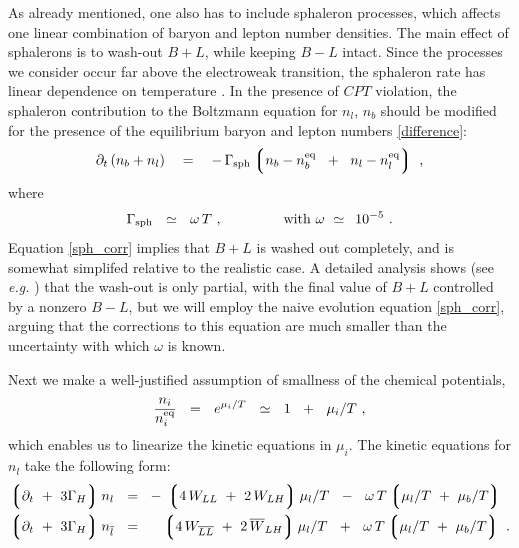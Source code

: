 \documentclass[12pt]{revtex4}
\newcommand{\eq}{{\rm eq}}
\newcommand{\lgr}{\left\lgroup}
\newcommand{\rgr}{\right\rgroup}
\newcommand{\Gsph}{\Gamma_{\rm sph}}
\newcommand{\p}{\partial}
\newcommand{\ov}{\overline}
\begin{document}
	As already mentioned,
	one also has to include sphaleron processes, which affects 
	one linear combination of baryon and lepton number densities.
	The main effect of sphalerons is to wash-out $ B + L $,
	while keeping $ B - L $ intact. 
	Since the processes we consider occur far above the electroweak transition,  the sphaleron rate
has linear
	dependence on temperature 
\cite{Kuzmin:1985mm,Khlebnikov:1988sr}. 
	In the presence of $CPT$ violation, the sphaleron contribution to the Boltzmann equation
	for $ n_l $, $ n_b $ 
\cite{Kuzmin:1985mm,Moore:2000mx,Moore:2000ar} should be modified for the presence of the 
equilibrium baryon and lepton numbers \eqref{difference}:
\begin{equation}
\label{sph_corr}
	\p_t\, (n_b + n_l)
	~~~=~~~ -\, \Gsph 
		\lgr   n_b - n_b^\eq \;~+~\;
		       n_l - n_l^\eq 
		\rgr~,
\end{equation}
	where
\[
	\Gsph ~~\simeq~~ \omega\, T~, \qquad\qquad 
	{\rm ~with~}
	\omega ~\simeq~ \,10^{-5}~.
\]
	Equation \eqref{sph_corr} implies that $ B + L $ is washed out completely,
	and is somewhat simplifed relative to the realistic case.
	A detailed analysis shows (see {\em e.g.}
\cite{Harvey:1990qw})
	that the wash-out is only partial, with the final value of $B+L$ controlled by a nonzero $B-L$,
but we will employ the naive evolution equation
	\eqref{sph_corr}, arguing that the corrections to this equation are much smaller
	than the uncertainty with which $ \omega $ is known.
	
	Next we make a well-justified assumption of 
	smallness of the chemical potentials,
\[
	\frac{n_i}{n_i^\eq} ~~=~~ e^{\mu_i/T} ~~\simeq~~ 1 ~~+~~ \mu_i/T~,
\]
	which enables us to linearize the kinetic equations in $ \mu_i $.	
The kinetic equations for $ n_l$ take the following form:
\begin{equation}
\label{kinetic_eqn_prelim}
\begin{split}
	\lgr \p_t ~+~ 3\Gamma_H \rgr
		n_l ~~=~~ & 
	-\, \lgr 4\, W_{LL} ~+~ 2\, W_{L{H}} \rgr  \mu_l/T 
	~~-~~
	\omega\, T \lgr \mu_l/T ~+~ \mu_b/T \rgr 
	\\
	\lgr \p_t ~+~ 3\Gamma_H \rgr
		n_{\ov{l}} ~~=~~ &
	\phantom{-\,}
	\lgr 4\, W_{\ov{LL}} ~+~ 2\, \ov{W}_{L{H}} \rgr  \mu_l/T 
	~~+~~
	\omega\, T \lgr \mu_l/T ~+~ \mu_b/T \rgr ~.
\end{split}
\end{equation}
\end{document}
